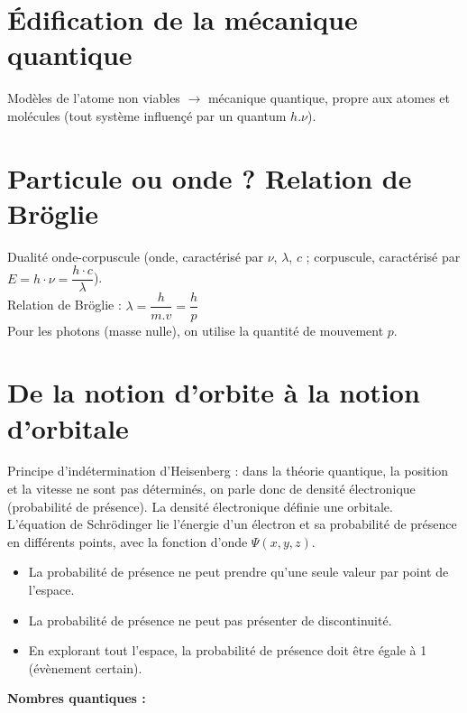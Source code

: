 \documentclass[13pt, twoside, a4paper, french, tikz]{report}
\begin{document}
    \section{Édification de la mécanique quantique}\label{sec:edification-de-la-mecanique-quantique}

    Modèles de l'atome non viables $\rightarrow$ mécanique quantique, propre aux atomes et molécules (tout système influençé par un quantum $h.\nu$).


    \section{Particule ou onde ? Relation de Bröglie}\label{sec:particule-ou-onde-?-relation-de-broglie}

    Dualité onde-corpuscule (onde, caractérisé par $\nu$, $\lambda$, $c$ ; corpuscule, caractérisé par $E = h \cdot \nu = \dfrac{h \cdot c}{\lambda}$).\\
    Relation de Bröglie : $\lambda = \dfrac{h}{m . v} = \dfrac{h}{p}$\\
    Pour les photons (masse nulle), on utilise la quantité de mouvement $p$.


    \section{De la notion d'orbite à la notion d'orbitale}\label{sec:de-la-notion-dorbite-a-la-notion-dorbitale}

    Principe d'indétermination d'Heisenberg : dans la théorie quantique, la position et la vitesse ne sont pas déterminés, on parle donc de densité électronique (probabilité de présence).
    La densité électronique définie une orbitale.\\

    L'équation de Schrödinger lie l'énergie d'un électron et sa probabilité de présence en différents points, avec la fonction d'onde $\Psi(x, y, z)$.
    \begin{itemize}
        \item La probabilité de présence ne peut prendre qu'une seule valeur par point de l'espace.
        \item La probabilité de présence ne peut pas présenter de discontinuité.
        \item En explorant tout l'espace, la probabilité de présence doit être égale à 1 (évènement certain).
    \end{itemize}

    \vspace{7pt}
    \textbf{Nombres quantiques :}
    \vspace{7pt}
\end{document}
